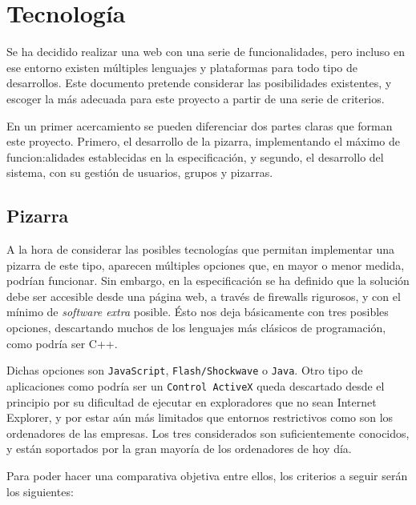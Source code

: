 \section{Tecnolog\'ia} %
\label{sec:tecnologia}

Se ha decidido realizar una web con una serie de funcionalidades, pero incluso en ese entorno existen múltiples lenguajes y plataformas para todo tipo de desarrollos. Este documento pretende considerar las posibilidades existentes, y escoger la más adecuada para este proyecto a partir de una serie de criterios.

En un primer acercamiento se pueden diferenciar dos partes claras que forman este proyecto. Primero, el desarrollo de la pizarra, implementando el máximo de funcion:alidades establecidas en la especificación, y segundo, el desarrollo del sistema, con su gestión de usuarios, grupos y pizarras.

\subsection{Pizarra}
A la hora de considerar las posibles tecnologías que permitan implementar una pizarra de este tipo, aparecen múltiples opciones que, en mayor o menor medida, podrían funcionar. Sin embargo, en la especificación se ha definido que la solución debe ser accesible desde una página web, a través de firewalls rigurosos, y con el mínimo de \emph{software extra} posible. Ésto nos deja básicamente con tres posibles opciones, descartando muchos de los lenguajes más clásicos de programación, como podría ser C++.

Dichas opciones son \texttt{JavaScript}, \texttt{Flash/Shockwave} o \texttt{Java}. Otro tipo de aplicaciones como podría ser un \texttt{Control ActiveX} queda descartado desde el principio por su dificultad de ejecutar en exploradores que no sean Internet Explorer, y por estar aún más limitados que entornos restrictivos como son los ordenadores de las empresas. Los tres considerados son suficientemente conocidos, y están soportados por la gran mayoría de los ordenadores de hoy día.

Para poder hacer una comparativa objetiva entre ellos, los criterios a seguir serán los siguientes:

